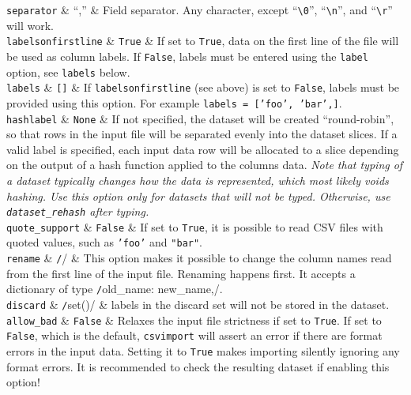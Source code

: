   \RP \texttt{separator} & ``,'' & Field separator.  Any character, except
  ``\verb$\0$'', ``\verb$\n$'', and ``\verb$\r$'' will work.\\

  
  \RP \texttt{labelsonfirstline} & \texttt{True} & If set to
  \texttt{True}, data on the first line of the file will be used as
  column labels.  If \texttt{False}, labels must be entered using the
  \texttt{label} option, see \texttt{labels} below.\\

  \RP \texttt{labels} & \texttt{[]} & If \texttt{labelsonfirstline} (see
  above) is set to \texttt{False}, labels must be provided using this
  option.  For example \texttt{labels = ['foo', 'bar',]}.\\

  \RP \texttt{hashlabel} & \texttt{None} & If not specified, the dataset
  will be created ``round-robin'', so that rows in the input file will
  be separated evenly into the dataset slices.  If a valid label is
  specified, each input data row will be allocated to a slice
  depending on the output of a hash function applied to the columns
  data.  \textsl{Note that typing of a dataset typically changes how
    the data is represented, which most likely voids hashing.  Use
    this option only for datasets that will not be typed.  Otherwise,
    use \texttt{dataset\_rehash} after typing.}\\

  \RP \texttt{quote\_support} & \texttt{False} & If set to \texttt{True},
  it is possible to read CSV files with quoted values, such as
  \texttt{'foo'} and \texttt{"bar"}.\\

  \RP \texttt{rename} & \texttt/{}/ & This option makes it possible to
  change the column names read from the first line of the input file.
  Renaming happens first.  It accepts a dictionary of type
  \texttt/{old_name: new_name,}/.\\

  \RP \texttt{discard} & \texttt/set()/ & labels in the discard set will
  not be stored in the dataset.\\
  
  \RP \texttt{allow\_bad} & \texttt{False} & Relaxes the input file
  strictness if set to \texttt{True}.  If set to \texttt{False}, which
  is the default, \texttt{csvimport} will assert an error if there are
  format errors in the input data.  Setting it to \texttt{True} makes
  importing silently ignoring any format errors.  It is recommended to
  check the resulting dataset if enabling this option!\\
\stoptable



